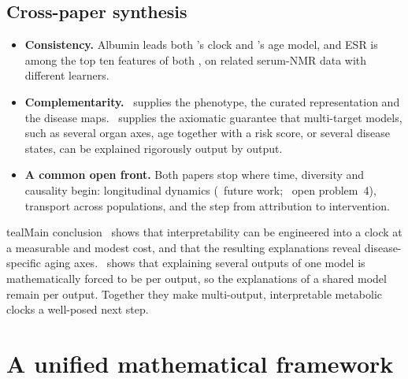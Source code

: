 \documentclass[11pt,a4paper]{article}
\newenvironment{conclusion}{\begin{callout}{teal}{Main conclusion}}{\end{callout}}
\theoremstyle{plain}
\theoremstyle{definition}
\theoremstyle{remark}
\begin{document}
\subsection{Cross-paper synthesis}
\begin{itemize}
\item \textbf{Consistency.} Albumin leads both \PI's clock and \PII's age model, and ESR is among the top ten features of both \PII[Fig.~2, p.~15], on related serum-NMR data with different learners.
\item \textbf{Complementarity.} \PI\ supplies the phenotype, the curated representation and the disease maps. \PII\ supplies the axiomatic guarantee that multi-target models, such as several organ axes, age together with a risk score, or several disease states, can be explained rigorously output by output.
\item \textbf{A common open front.} Both papers stop where time, diversity and causality begin: longitudinal dynamics (\PI\ future work; \PII\ open problem~4), transport across populations, and the step from attribution to intervention.
\end{itemize}

\begin{conclusion}
\PI\ shows that interpretability can be engineered into a clock at a measurable and modest cost, and that the resulting explanations reveal disease-specific aging axes. \PII\ shows that explaining several outputs of one model is mathematically forced to be per output, so the explanations of a shared model remain per output. Together they make multi-output, interpretable metabolic clocks a well-posed next step.
\end{conclusion}

\section{A unified mathematical framework}
\label{sec:framework}
\end{document}
